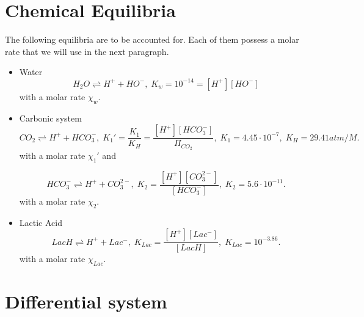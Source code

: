 \documentclass{revtex4}
\begin{document}
\section{Chemical Equilibria}
The following equilibria are to be accounted for. Each of them possess a molar rate that we will use
in the next paragraph.
\begin{itemize}
\item{Water}
\begin{equation}
	H_2O \rightleftharpoons H^+ + HO^-, \; K_w = 10^{-14} = \left[H^+\right]\left[HO^-\right]
\end{equation}	
with a molar rate $\chi_w$.

\item{Carbonic system}
\begin{equation}
	CO_2 \rightleftharpoons H^+ + HCO_3^-, \; K_1' = \dfrac{K_1}{K_H} = \dfrac{\left[H^+\right]\left[HCO_3^-\right]}{\Pi_{CO_2}}
	, \; K_1=4.45\cdot10^{-7},\;K_H=29.41 atm/M.
\end{equation}
with a molar rate $\chi_1'$ and

\begin{equation}
	HCO_3^- \rightleftharpoons H^+ + CO_3^{2-}, \; K_2  = \dfrac{\left[H^+\right]\left[CO_3^{2-}\right]}{\left[HCO_3^-\right]}
	,\;K_2 = 5.6\cdot10^{-11}.
\end{equation}
with a molar rate $\chi_2$.

\item{Lactic Acid}
\begin{equation}
	LacH \rightleftharpoons H^+ + Lac^-, \; K_{Lac} = \dfrac{\left[H^+\right]\left[Lac^-\right]}{\left[LacH\right]},
	\;K_{Lac} = 10^{-3.86}.
\end{equation}
with a molar rate $\chi_{Lac}$.
\end{itemize}


\section{Differential system}
\end{document}
